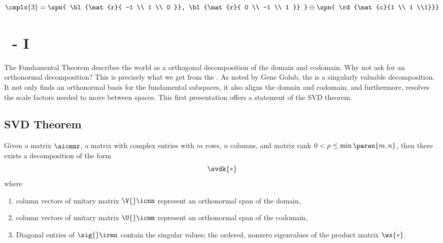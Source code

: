   \begin{equation*}   %
      \cmplx{3} = \spn { \bl{\mat{r}{ -1 \\ 1 \\ 0 }}, \bl{\mat{r}{ 0 \\ -1 \\ 1 }} } \oplus \spn { \rd{\mat{c}{1 \\ 1 \\1}}}
  \end{equation*}

\section{\bsvd\ - I}  %
The Fundamental Theorem describes the world as a orthogonal decomposition of the domain and codomain. Why not ask for an orthonormal decomposition? This is precisely what we get from the \asvd.
As noted by Gene Golub, the \asvd is a singularly valuable decomposition. It not only finds an orthonormal basis for the fundamental subspaces, it also aligns the domain and codomain, and furthermore, resolves the scale factors needed to move between spaces. This first presentation offers a statement of the SVD theorem.

\subsection{\label{ssec:SVD Theorem}SVD Theorem}  %
Given a matrix $\aicmnr$, a matrix with complex entries with $m$ rows, $n$ columns, and matrix rank $0<\rho\le\min\paren{m,n}$, then there exists a decomposition of the form
  \begin{equation}   %
    \svdk{*}
    \label{eq:svdk}
  \end{equation}
where
\begin{enumerate}
  \item column vectors of unitary matrix $\V{}\icnn$ represent an orthonormal span of the domain,
  \item column vectors of unitary matrix $\U{}\icmm$ represent an orthonormal span of the codomain,
  \item Diagonal entries of $\sig{}\irmn$ contain the singular values; the ordered, nonzero eigenvalues of the product matrix $\wx{*}$.
\end{enumerate}

